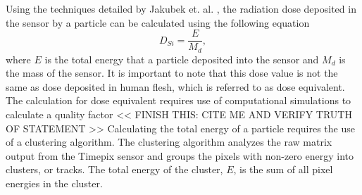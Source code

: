 
Using the techniques detailed by Jakubek et. al. \cite{Jakubek-Analysis}, the radiation dose deposited in the sensor by a particle can be calculated using the following equation
\begin{equation*}
  D_{Si} = \dfrac{E}{M_d},
\end{equation*}
where $E$ is the total energy that a particle deposited into the sensor and $M_d$ is the mass of the sensor.
It is important to note that this dose value is not the same as dose deposited in human flesh, which is referred to as dose equivalent.
The calculation for dose equivalent requires use of computational simulations to calculate a quality factor \cite{CITE ME} << FINISH THIS: CITE ME AND VERIFY TRUTH OF STATEMENT >>
Calculating the total energy of a particle requires the use of a clustering algorithm.
The clustering algorithm analyzes the raw matrix output from the Timepix sensor and groups the pixels with non-zero energy into clusters, or tracks.
The total energy of the cluster, $E$, is the sum of all pixel energies in the cluster.

